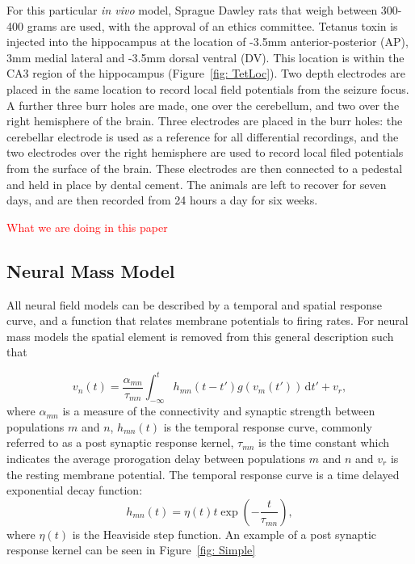 \documentclass{article}%
\newcommand\red{\textcolor{red}}
\begin{document}
For this particular \textsl{in vivo} model, Sprague Dawley rats that weigh between 300-400 grams are used, with the approval of an ethics committee. Tetanus toxin is injected into the hippocampus at the location of -3.5mm anterior-posterior (AP), 3mm medial lateral and -3.5mm dorsal ventral (DV). This location is within the CA3 region of the hippocampus (Figure~\ref{fig: TetLoc}). Two depth electrodes are placed in the same location to record local field potentials from the seizure focus. A further three burr holes are made, one over the cerebellum, and two over the right hemisphere of the brain. Three electrodes are placed in the burr holes: the cerebellar electrode is used as a reference for all differential recordings, and the two electrodes over the right hemisphere are used to record local filed potentials from the surface of the brain. These electrodes are then connected to a pedestal and held in place by dental cement. The animals are left to recover for seven days, and are then recorded from 24 hours a day for six weeks.

 

\red{ What we are doing in this paper}


\subsection{Neural Mass Model} 

All neural field models can be described by a temporal and spatial response curve, and a function that relates membrane potentials to firing rates. For neural mass models the spatial element is removed from this general description such that

\begin{equation}\label{eq:conv_eq}
    v_n(t) = \frac{\alpha_{mn}}{\tau_{mn}}\int_{-\infty}^t  h_{mn}(t-t')g(v_m(t')) \,\mathrm{d}t' + v_r,
\end{equation}
where $\alpha_{mn}$ is a measure of the connectivity and synaptic strength between populations $m$ and $n$, $h_{mn}(t)$ is the temporal response curve, commonly referred to as a post synaptic response kernel, $\tau_{mn}$ is the time constant which indicates the average prorogation delay between populations $m$ and $n$ and $v_r$ is the resting membrane potential. The temporal response curve is a time delayed exponential decay function:
\begin{equation}
    h_{mn}(t) = \eta(t)t\exp\left(-\frac{t}{\tau_{mn}}\right),
\end{equation}
where $\eta(t)$ is the Heaviside step function. An example of a post synaptic response kernel can be seen in Figure~\ref{fig: Simple}
\end{document}
